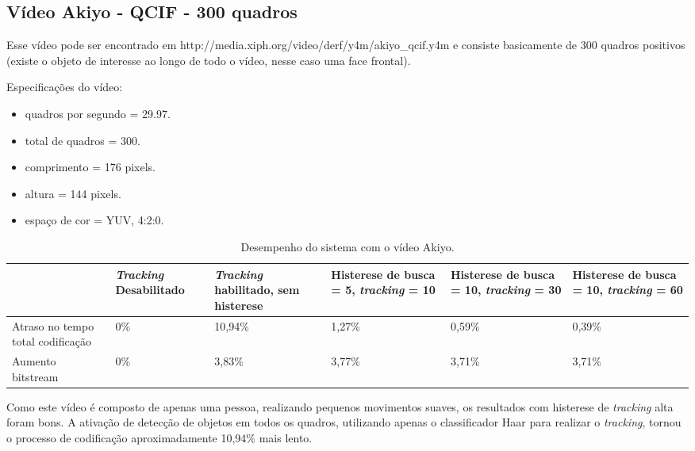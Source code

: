 \documentclass[12pt]{article}
\begin{document}
\subsection{ Vídeo Akiyo - QCIF - 300 quadros }


Esse vídeo pode ser encontrado em http://media.xiph.org/video/derf/y4m/akiyo\_qcif.y4m e consiste basicamente de 300 quadros positivos (existe o objeto de interesse ao longo de todo o vídeo, nesse caso uma face frontal).


Especificações do vídeo:

\begin{itemize}
        \item quadros por segundo = 29.97.
        \item total de quadros    = 300.
        \item comprimento         = 176 pixels.
        \item altura              = 144 pixels.
        \item espaço de cor       = YUV, 4:2:0.
\end{itemize}


\begin{table}[H]
\begin{center}
\begin{tabular}{|p{2.3cm}|p{2.3cm}|p{2.3cm}|p{2.3cm}|p{2.3cm}|p{2.3cm}|}
\hline
\textbf{} & \textbf{\textit{Tracking} Desabilitado} & \textbf{\textit{Tracking} habilitado, sem histerese} & \textbf{Histerese de busca = 5, \textit{tracking} = 10} & \textbf{Histerese de busca = 10, \textit{tracking} = 30} & \textbf{Histerese de busca = 10, \textit{tracking} = 60} \\
\hline
Atraso no tempo total codificação & 0\% & 10,94\% & 1,27\% & 0,59\% & 0,39\% \\
\hline
Aumento bitstream  & 0\% & 3,83\% & 3,77\% & 3,71\% & 3,71\% \\
\hline
\end{tabular}
\caption{Desempenho do sistema com o vídeo Akiyo.}
\label{tab:space_overhead}
\end{center}
\end{table}

Como este vídeo é composto de apenas uma pessoa, realizando pequenos movimentos suaves, os resultados com histerese de \textit{tracking} alta foram bons. A ativação de detecção de objetos em todos os quadros, utilizando apenas o classificador Haar para realizar o \textit{tracking}, tornou o processo de codificação aproximadamente 10,94\% mais lento. 
\end{document}
